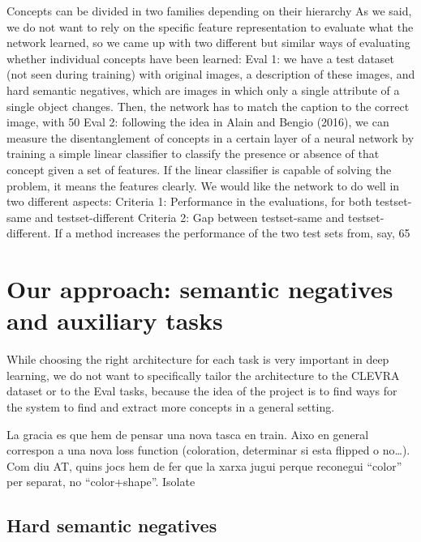 Concepts can be divided in two families depending on their hierarchy
As we said, we do not want to rely on the specific feature representation to evaluate what the network learned, so we came up with two different but similar ways of evaluating whether individual concepts have been learned:
Eval 1: we have a test dataset (not seen during training) with original images, a description of these images, and hard semantic negatives, which are images in which only a single attribute of a single object changes. Then, the network has to match the caption to the correct image, with 50%
Eval 2: following the idea in Alain and Bengio (2016), we can measure the disentanglement of concepts in a certain layer of a neural network by training a simple linear classifier to classify the presence or absence of that concept given a set of features. If the linear classifier is capable of solving the problem, it means the features clearly.
We would like the network to do well in two different aspects:
Criteria 1: Performance in the evaluations, for both testset-same and testset-different
Criteria 2: Gap between testset-same and testset-different. If a method increases the performance of the two test sets from, say, 65%


\section{Our approach: semantic negatives and auxiliary tasks}

While choosing the right architecture for each task is very important in deep learning, we do not want to specifically tailor the architecture to the CLEVRA dataset or to the Eval tasks, because the idea of the project is to find ways for the system to find and extract more concepts in a general setting.

La gracia es que hem de pensar una nova tasca en train. Aixo en general correspon a una nova loss function (coloration, determinar si esta flipped o no…). Com diu AT, quins jocs hem de fer que la xarxa jugui perque reconegui “color” per separat, no “color+shape”. Isolate

\subsection{Hard semantic negatives}

